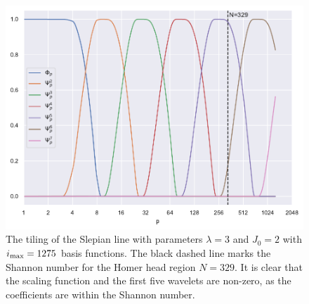 \begin{figure}[htpb]
	\centering\capstart{}
	\includegraphics[width=\textwidth]{homer_slepian_tiling_b1275.pdf}
	\caption[
		The tiling of the Slepian line for the Homer head region
	]{
		The tiling of the Slepian line with parameters \(\lambda=3\) and \(J_{0}=2\) with \(i_{\text{max}}=\num{1275}\) basis functions.
		The black dashed line marks the Shannon number for the Homer head region \(N=329\).
		It is clear that the scaling function and the first five wavelets are non-zero, as the coefficients are within the Shannon number.
	}\label{fig:chapter5_tiling}
\end{figure}
